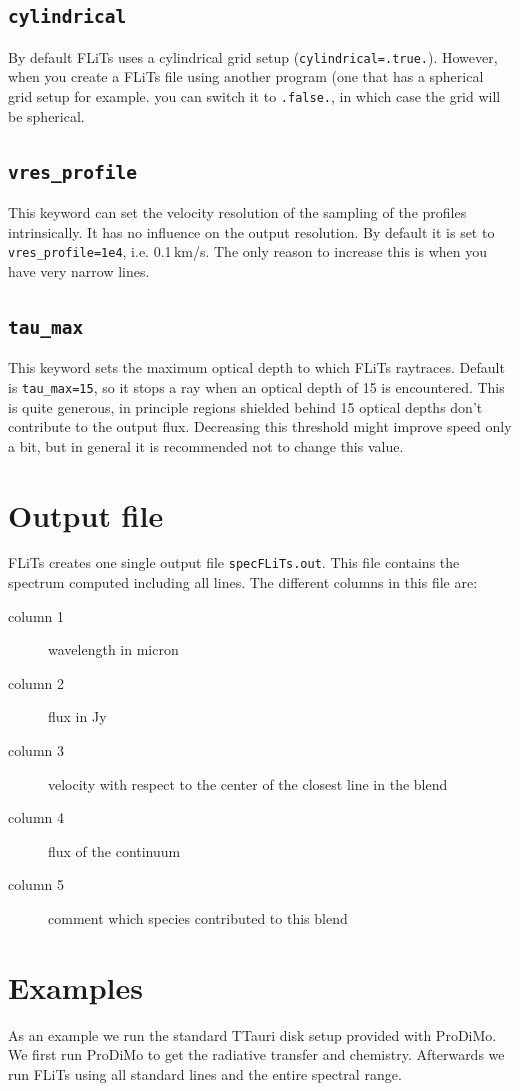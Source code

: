 \documentclass[12pt]{article}
\begin{document}
\subsection*{\texttt{cylindrical}}

By default FLiTs uses a cylindrical grid setup (\texttt{cylindrical=.true.}). However, when you create a FLiTs file using another program (one that has a spherical grid setup for example. you can switch it to \texttt{.false.}, in which case the grid will be spherical.

\subsection*{\texttt{vres\_profile}}

This keyword can set the velocity resolution of the sampling of the profiles intrinsically. It has no influence on the output resolution. By default it is set to \texttt{vres\_profile=1e4}, i.e. 0.1\,km/s. The only reason to increase this is when you have very narrow lines.

\subsection*{\texttt{tau\_max}}

This keyword sets the maximum optical depth to which FLiTs raytraces. Default is \texttt{tau\_max=15}, so it stops a ray when an optical depth of 15 is encountered. This is quite generous, in principle regions shielded behind 15 optical depths don't contribute to the output flux. Decreasing this threshold might improve speed only a bit, but in general it is recommended not to change this value.

\section{Output file}

FLiTs creates one single output file \texttt{specFLiTs.out}. This file contains the spectrum computed including all lines. The different columns in this file are:
\begin{description}
\item[column 1] wavelength in micron
\item[column 2] flux in Jy
\item[column 3] velocity with respect to the center of the closest line in the blend
\item[column 4] flux of the continuum
\item[column 5] comment which species contributed to this blend
\end{description}

\section{Examples}

As an example we run the standard TTauri disk setup provided with ProDiMo. We first run ProDiMo to get the radiative transfer and chemistry. Afterwards we run FLiTs using all standard lines and the entire spectral range.
\end{document}
